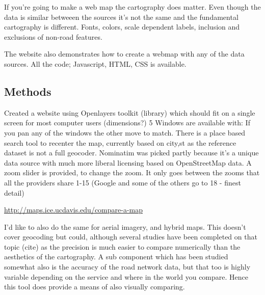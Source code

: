 \documentclass[12pt,letterpaper]{article}
\begin{document}
If you're going to make a web map the cartography does matter. Even though the data is similar betweeen the sources it's not the same and the fundamental cartography is different. 
Fonts, colors, scale dependent labels, inclusion and exclusions of non-road features.

The website also demonstrates how to create a webmap with any of the data sources. All the code; Javascript, HTML, CSS is available.

\subsection{Methods}
Created a website using Openlayers toolkit (library) which should fit on a single screen for most computer users (dimensions?)
5 Windows are available with:
If you pan any of the windows the other move to match.
There is a place based search tool to recenter the map, currently based on city,st as the reference dataset is not a full geocoder. Nominatim was picked partly because it's a unique data source with much more liberal licensing based on OpenStreetMap data.
A zoom slider is provided, to change the zoom. It only goes between the zooms that all the providers share 1-15 (Google and some of the others go to 18 - finest detail)

\url{http://maps.ice.ucdavis.edu/compare-a-map}

I'd like to also do the same for aerial imagery, and hybrid maps. This doesn't cover geocoding but could, although several studies have been completed on that topic (cite) as the precision is much easier to compare numerically than the aesthetics of the cartography. A sub component which has been studied somewhat also is the accuracy of the road network data, but that too is highly variable depending on the service and where in the world you compare. Hence this tool does provide a means of also visually comparing.

\end{document}
